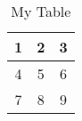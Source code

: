         \begin{table}[h]
            \caption{My Table}
            \begin {center}   %

                {\renewcommand{\arraystretch}{1.3 }%




                    \begin {tabular}{c c c }    %

                        \hline      %

                        1 & 2& 3\\ [0.5ex]   %

                        \hline\hline     %

                        4& 5& 6\\   %

                        7& 8& 9\\ [1ex]    %


\end{tabular}}
\end{center}
\end{table}
